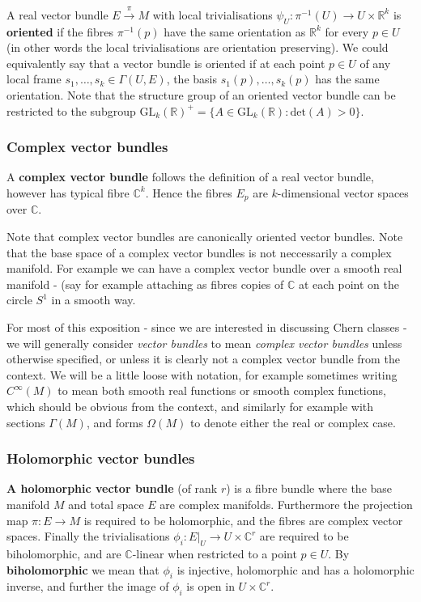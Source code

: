 \documentclass[a4paper]{article}
\theoremstyle{definition} \newtheorem*{definition}{Definition}
\theoremstyle{definition} \newtheorem*{definitions}{Definitions}
\theoremstyle{plain} \newtheorem{theorem}{Theorem}[section]
\theoremstyle{plain} \newtheorem{proposition}[theorem]{Proposition}
\theoremstyle{plain} \newtheorem{corollary}[theorem]{Corollary}
\theoremstyle{plain} \newtheorem{lemma}[theorem]{Lemma}
\theoremstyle{plain} \newtheorem{example}[theorem]{Example}
\newcommand{\defn}[1]{\textbf{#1}}
\newcommand{\realnos}{\mathbb{R}}
\newcommand{\complexnos}{\mathbb{C}}
\begin{document}
A real vector bundle $E\xrightarrow{\pi} M$ with local trivialisations $\psi_U:\pi^{-1}(U)\to U\times \realnos^k$ is \defn{oriented} if the fibres $\pi^{-1}(p)$ have the same orientation as $\realnos^k$ for every $p \in U$ 
(in other words the local trivialisations are orientation preserving). 
We could equivalently say that a vector bundle is oriented if at each point $p\in U$ of any local frame $s_1, \ldots, s_k\in \Gamma(U, E)$, the basis $s_1(p), \ldots, s_k(p)$ has the same orientation. 
Note that the structure group of an oriented vector bundle can be restricted to the subgroup $\mathrm{GL}_k(\realnos)^+=\{A\in \mathrm{GL}_k(\realnos): \mathrm{det}(A)>0\}$.

\subsubsection{Complex vector bundles}

A \defn{complex vector bundle} follows the definition of a real vector bundle, however has typical fibre $\complexnos^k$. Hence the fibres $E_p$ are $k$-dimensional vector spaces over $\complexnos$. 

Note that complex vector bundles are canonically oriented vector bundles. Note that the base space of a complex vector bundles is not neccessarily a complex manifold. For example we can have a complex vector bundle over a smooth real manifold - (say for example attaching as fibres copies of $\complexnos$ at each point on the circle $S^1$ in a smooth way. 

For most of this exposition - since we are interested in discussing Chern classes - we will generally consider \emph{vector bundles} to mean \emph{complex vector bundles} unless otherwise specified, or unless it is clearly not a complex vector bundle from the context. We will be a little loose with notation, for example sometimes writing $C^\infty (M)$ to mean both smooth real functions or smooth complex functions, which should be obvious from the context, and similarly for example with  sections $\Gamma(M)$, and forms $\Omega(M)$ to denote either the real or complex case. 

\subsubsection{Holomorphic vector bundles}
\defn{A holomorphic vector bundle} (of rank $r$) is a fibre bundle where the base manifold $M$ and total space $E$ are complex manifolds. Furthermore the projection map $\pi:E\to M$ is required to be holomorphic, and the fibres are complex vector spaces. Finally the trivialisations $\phi_i:E|_U \to U\times \complexnos^r$ are required to be biholomorphic, and are $\complexnos$-linear when restricted to a point $p\in U$. By \defn{biholomorphic} we mean that $\phi_i$ is injective, holomorphic and has a holomorphic inverse, and further the image of $\phi_i$ is open in $U\times \complexnos^r$. 
\end{document}
